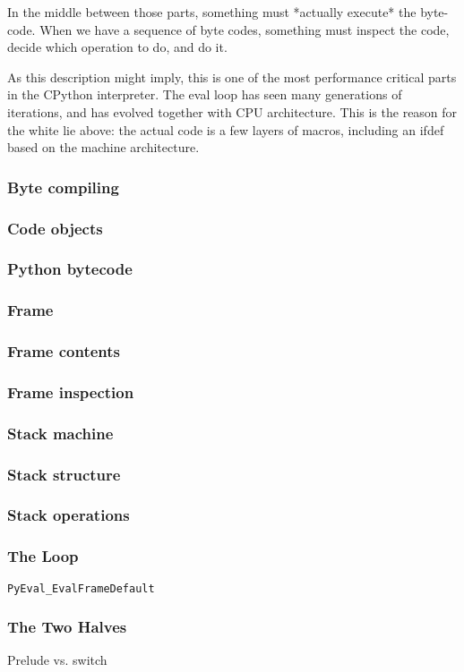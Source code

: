 In the middle between those parts,
something must
*actually execute*
the byte-code.
When we have a sequence of byte codes,
something must inspect the code,
decide which operation to do,
and do it.

As this description might imply,
this is one of the most performance critical parts
in the CPython interpreter.
The eval loop has seen many generations of iterations,
and has evolved together with CPU architecture.
This is the reason for the white lie above:
the actual code is a few layers of macros,
including an ifdef based on the machine architecture.


\begin{frame}
\frametitle{Byte compiling}
\end{frame}

\begin{frame}
\frametitle{Code objects}
\end{frame}

\begin{frame}
\frametitle{Python bytecode}
\end{frame}

\begin{frame}
\frametitle{Frame}
\end{frame}

\begin{frame}
\frametitle{Frame contents}
\end{frame}

\begin{frame}
\frametitle{Frame inspection}
\end{frame}

\begin{frame}
\frametitle{Stack machine}
\end{frame}

\begin{frame}
\frametitle{Stack structure}
\end{frame}

\begin{frame}
\frametitle{Stack operations}
\end{frame}

\begin{frame}[fragile]
\frametitle{The Loop}
\verb|PyEval_EvalFrameDefault|
\end{frame}

\begin{frame}
\frametitle{The Two Halves}
Prelude vs. switch
\end{frame}

